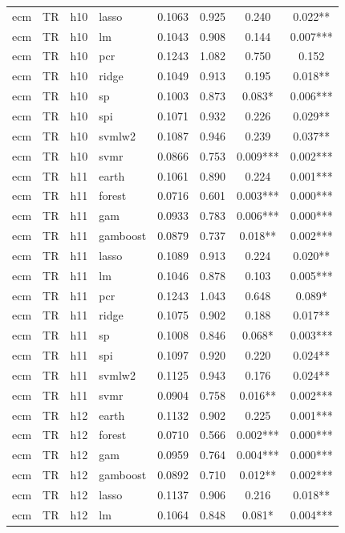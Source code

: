\begin{ThreePartTable}
\begin{longtable}[t]{llclcccc}
ecm & TR & h10 & lasso & 0.1063 & 0.925 & 0.240 & 0.022**\\
ecm & TR & h10 & lm & 0.1043 & 0.908 & 0.144 & 0.007***\\
ecm & TR & h10 & pcr & 0.1243 & 1.082 & 0.750 & 0.152\\
ecm & TR & h10 & ridge & 0.1049 & 0.913 & 0.195 & 0.018**\\
ecm & TR & h10 & sp & 0.1003 & 0.873 & 0.083* & 0.006***\\
ecm & TR & h10 & spi & 0.1071 & 0.932 & 0.226 & 0.029**\\
ecm & TR & h10 & svmlw2 & 0.1087 & 0.946 & 0.239 & 0.037**\\
ecm & TR & h10 & svmr & 0.0866 & 0.753 & 0.009*** & 0.002***\\
\addlinespace
ecm & TR & h11 & earth & 0.1061 & 0.890 & 0.224 & 0.001***\\
ecm & TR & h11 & forest & 0.0716 & 0.601 & 0.003*** & 0.000***\\
ecm & TR & h11 & gam & 0.0933 & 0.783 & 0.006*** & 0.000***\\
ecm & TR & h11 & gamboost & 0.0879 & 0.737 & 0.018** & 0.002***\\
ecm & TR & h11 & lasso & 0.1089 & 0.913 & 0.224 & 0.020**\\
ecm & TR & h11 & lm & 0.1046 & 0.878 & 0.103 & 0.005***\\
ecm & TR & h11 & pcr & 0.1243 & 1.043 & 0.648 & 0.089*\\
ecm & TR & h11 & ridge & 0.1075 & 0.902 & 0.188 & 0.017**\\
ecm & TR & h11 & sp & 0.1008 & 0.846 & 0.068* & 0.003***\\
ecm & TR & h11 & spi & 0.1097 & 0.920 & 0.220 & 0.024**\\
ecm & TR & h11 & svmlw2 & 0.1125 & 0.943 & 0.176 & 0.024**\\
ecm & TR & h11 & svmr & 0.0904 & 0.758 & 0.016** & 0.002***\\
\addlinespace
ecm & TR & h12 & earth & 0.1132 & 0.902 & 0.225 & 0.001***\\
ecm & TR & h12 & forest & 0.0710 & 0.566 & 0.002*** & 0.000***\\
ecm & TR & h12 & gam & 0.0959 & 0.764 & 0.004*** & 0.000***\\
ecm & TR & h12 & gamboost & 0.0892 & 0.710 & 0.012** & 0.002***\\
ecm & TR & h12 & lasso & 0.1137 & 0.906 & 0.216 & 0.018**\\
ecm & TR & h12 & lm & 0.1064 & 0.848 & 0.081* & 0.004***\\

\end{longtable}
\end{ThreePartTable}
